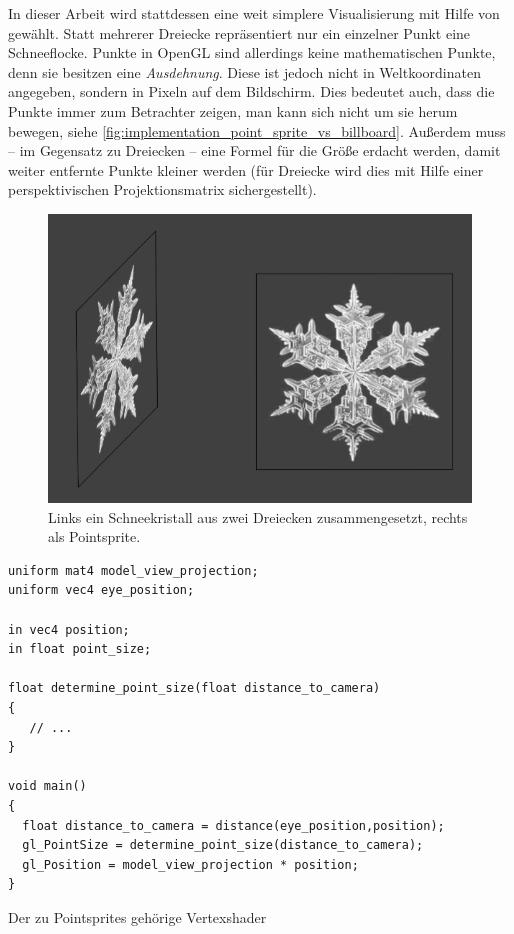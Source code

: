 In dieser Arbeit wird stattdessen eine weit simplere Visualisierung
mit Hilfe von  gewählt. Statt mehrerer
Dreiecke repräsentiert nur ein einzelner Punkt eine
Schneeflocke. Punkte in OpenGL sind allerdings keine mathematischen
Punkte, denn sie besitzen eine \emph{Ausdehnung}. Diese ist jedoch
nicht in Weltkoordinaten angegeben, sondern in Pixeln auf dem
Bildschirm. Dies bedeutet auch, dass die Punkte immer zum Betrachter
zeigen, man kann sich nicht um sie herum bewegen, siehe
\autoref{fig:implementation_point_sprite_vs_billboard}. Außerdem muss
-- im Gegensatz zu Dreiecken -- eine Formel für die Größe erdacht
werden, damit weiter entfernte Punkte kleiner werden (für Dreiecke
wird dies mit Hilfe einer perspektivischen Projektionsmatrix
sichergestellt).

\begin{figure}[ht]
    \centering
    \includegraphics{images/point_sprite_vs_billboard}
    \caption{Links ein Schneekristall aus zwei Dreiecken zusammengesetzt, rechts als Pointsprite.}
    \label{fig:implementation_point_sprite_vs_billboard}
\end{figure}

\begin{listing}
\begin{verbatim}
uniform mat4 model_view_projection;
uniform vec4 eye_position;

in vec4 position;
in float point_size;

float determine_point_size(float distance_to_camera)
{
   // ...
}

void main()
{
  float distance_to_camera = distance(eye_position,position);
  gl_PointSize = determine_point_size(distance_to_camera);
  gl_Position = model_view_projection * position;
}
\end{verbatim}
\caption{Der zu Pointsprites gehörige Vertexshader}
\label{lst:implementation_point_sprite_vertex_shader}
\end{listing}

